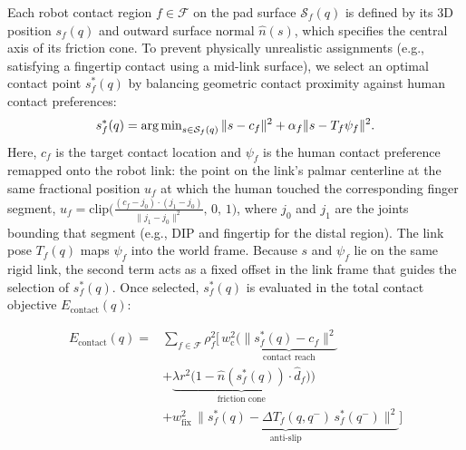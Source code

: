  Each robot contact region $f \in \mathcal{F}$ on the pad surface $\mathcal{S}_f(q)$ is defined by its 3D position $s_f(q)$ and outward surface normal $\hat{n}(s)$, which specifies the central axis of its friction cone. To prevent physically unrealistic assignments (e.g., satisfying a fingertip contact using a mid-link surface), we select an optimal contact point $s^{*}_f(q)$ by balancing geometric contact proximity against human contact preferences:
\begingroup\setlength{\abovedisplayskip}{3pt}\setlength{\belowdisplayskip}{3pt}\setlength{\abovedisplayshortskip}{1pt}\setlength{\belowdisplayshortskip}{1pt}
\begin{equation}\label{eq:selector}s^*_f(q) = \operatorname*{arg\,min}\nolimits_{s \in \mathcal{S}_f(q)} \|s - c_f\|^2 + \alpha_f \|s - T_f\psi_f\|^2.\end{equation}\endgroup
Here, $c_f$ is the target contact location and $\psi_f$ is the human contact preference remapped onto the robot link: the point on the link's palmar centerline at the same fractional position $u_f$ at which the human touched the corresponding finger segment, $u_f = \mathrm{clip}\big(\tfrac{(c_f - j_0)\cdot(j_1 - j_0)}{\|j_1 - j_0\|^2},\, 0,\, 1\big)$, where $j_0$ and $j_1$ are the joints bounding that segment (e.g., DIP and fingertip for the distal region). The link pose $T_f(q)$ maps $\psi_f$ into the world frame. Because $s$ and $\psi_f$ lie on the same rigid link, the second term acts as a fixed offset in the link frame that guides the selection of $s^{*}_f(q)$. Once selected, $s^{*}_f(q)$ is evaluated in the total contact objective $E_{\mathrm{contact}}(q)$:

\begin{equation}
\label{eq:contact}
\begin{split}
E_{\mathrm{contact}}(q) = {}& \sum_{f \in \mathcal{F}} \rho_f^2 \Big[\, w_{\mathrm{c}}^2 \Big( \underbrace{\big\| s^{*}_f(q) - c_f \big\|^2}_{\text{contact reach}} \\
& + \underbrace{\lambda r^2 \big(1 - \hat{n}(s^{*}_f(q)) \cdot \hat{d}_f\big)}_{\text{friction cone}} \Big) \\
& + \underbrace{w_{\mathrm{fix}}^2\, \big\| s^{*}_f(q) - \Delta T_f(q,q^{-})\, s^{*}_f(q^{-}) \big\|^2}_{\text{anti-slip}} \Big]
\end{split}
\end{equation}

